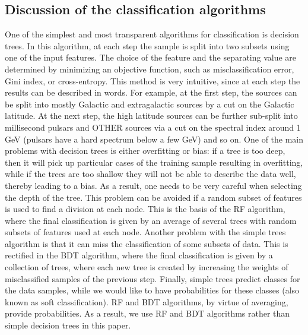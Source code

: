 \documentclass[referee]{aa} %
\newcommand{\lb}{\label}
\begin{document}
\subsection{Discussion of the classification algorithms}
\lb{sec:class_alg}


One of the simplest and most transparent algorithms for classification is decision trees.
In this algorithm, at each step the sample is split into two subsets using one of the input features.
The choice of the feature and the separating value are determined by minimizing an objective function, such as misclassification
error, Gini index, or cross-entropy.
This method is very intuitive, since at each step the results can be described in words. 
For example, at the first step, the sources can be split into mostly Galactic and extragalactic sources by a cut on the Galactic latitude.
At the next step, the high latitude sources can be further sub-split into millisecond pulsars and OTHER sources via a cut on the spectral index around 1 GeV (pulsars have a hard spectrum below a few GeV) and so on.
One of the main problems with decision trees is either overfitting or bias: if a tree is too deep, then it will pick up particular cases of the training sample resulting in overfitting, while if the trees are too shallow they will not be able to describe the data well, thereby leading to a bias. 
As a result, one needs to be very careful when selecting the depth of the tree.
This problem can be avoided if a random subset of features is used to find a division at each node. This is the basis of the RF algorithm,
where the final classification is given by an average of several trees with random subsets of features used at each node.
Another problem with the simple trees algorithm is that it can miss the classification of some subsets of data. This is rectified in the BDT algorithm, where the final classification is given by a collection of trees, where each new tree is created by increasing the weights of misclassified samples of the previous step. 
Finally, simple trees predict classes for the data samples, while we would like to have probabilities for these classes (also known as soft classification).
RF and BDT algorithms, by virtue of averaging, provide probabilities. As a result, we use RF and BDT algorithms rather than simple decision trees in this paper.
\end{document}
